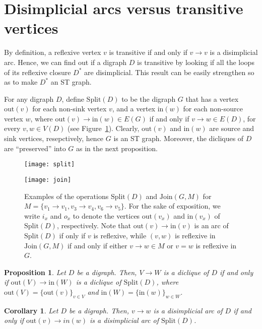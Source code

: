 \documentclass[a4paper,11pt]{article}
\newtheorem{corollary}[theorem]{Corollary}
\newtheorem{proposition}[theorem]{Proposition}
\newcommand{\SPLIT}{\ensuremath{\mathrm{Split}}}
\newcommand{\JOIN}{\ensuremath{\mathrm{Join}}}
\newcommand{\IN}{\ensuremath{\mathrm{in}}}
\newcommand{\OUT}{\ensuremath{\mathrm{out}}}
\begin{document}
\section{Disimplicial arcs versus transitive vertices}
\label{sec:disimplicial vs transitive}

By definition, a reflexive vertex $v$ is transitive if and only if $v \to v$ is a disimplicial arc.  Hence, we can find out if a digraph $D$ is transitive by looking if all the loops of its reflexive closure $D^*$ are disimplicial.  This result can be easily strengthen so as to make $D^*$ an ST graph.  

For any digraph $D$, define $\SPLIT(D)$ to be the digraph $G$ that has a vertex $\OUT(v)$ for each non-sink vertex $v$, and a vertex $\IN(w)$ for each non-source vertex $w$, where $\OUT(v) \to \IN(w) \in E(G)$ if and only if $v \to w \in E(D)$, for every $v,w \in V(D)$ (see Figure~\ref{fig:split+join}). Clearly, $\OUT(v)$ and $\IN(w)$ are source and sink vertices, resepctively, hence $G$ is an ST graph.  Moreover, the dicliques of $D$ are ``preserved'' into $G$ as in the next proposition.

\begin{figure}
 \centering
 \texttt{[image: split]}
 
 \texttt{[image: join]}
 \caption{Examples of the operations $\SPLIT(D)$ and $\JOIN(G, M)$ for $M = \{v_1 \to v_1, v_3 \to v_4, v_6 \to v_5\}$.  For the sake of exposition, we write $i_x$ and $o_x$ to denote the vertices $\OUT(v_x)$ and $\IN(v_x)$ of $\SPLIT(D)$, respectively.  Note that $\OUT(v) \to \IN(v)$ is an arc of $\SPLIT(D)$ if only if $v$ is reflexive, while $(v, w)$ is reflexive in $\JOIN(G, M)$ if and only if either $v \to w \in M$ or $v = w$ is reflexive in $G$.}\label{fig:split+join}
\end{figure}


\begin{proposition}\label{prop:SPLIT dicliques}
  Let $D$ be a digraph.  Then, $V \to W$ is a diclique of $D$ if and only if\/ $\OUT(V) \to \IN(W)$ is a diclique of\/ $\SPLIT(D)$, where\/ $\OUT(V) = \{\OUT(v)\}_{v \in V}$ and\/ $\IN(W) = \{\IN(w)\}_{w \in W}$.
\end{proposition}

\begin{corollary}\label{cor:SPLIT disimplicials}
  Let $D$ be a digraph.  Then, $v \to w$ is a disimplicial arc of $D$ if and only if\/ $\OUT(v) \to in(w)$ is a disimplicial arc of\/ $\SPLIT(D)$.
\end{corollary}
\end{document}
